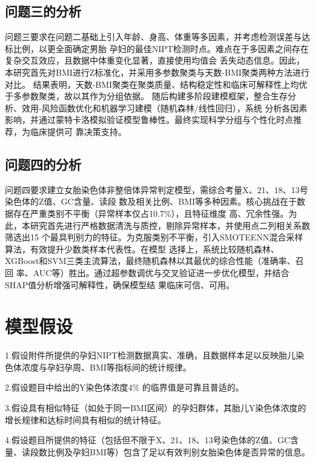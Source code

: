 \documentclass{article}
\begin{document}
\subsection{\textbf{问题三的分析}}
问题三要求在问题二基础上引入年龄、身高、体重等多因素，并考虑检测误差与达标比例，以更全面确定男胎
孕妇的最佳NIPT检测时点。难点在于多因素之间存在复杂交互效应，且数据中体重变化显著，直接使用均值会
丢失动态信息。因此，本研究首先对BMI进行Z标准化，并采用多参数聚类与天数-BMI聚类两种方法进行对比。
结果表明，天数-BMI聚类在聚类质量、结构稳定性和临床可解释性上均优于多参数聚类，故以其作为分组依据。
随后构建多阶段建模框架，整合生存分析、效用-风险函数优化和机器学习建模（随机森林/线性回归），系统
分析各因素影响，并通过蒙特卡洛模拟验证模型鲁棒性。最终实现科学分组与个性化时点推荐，为临床提供可
靠决策支持。
\subsection{\textbf{问题四的分析}}
问题四要求建立女胎染色体非整倍体异常判定模型，需综合考量X、21、18、13号染色体的Z值、GC含量、读段
数及相关比例、BMI等多种因素。核心挑战在于数据存在严重类别不平衡（异常样本仅占10.7\%），且特征维度
高、冗余性强。为此，本研究首先进行严格数据清洗与质控，剔除异常样本，并使用点二列相关系数筛选出15
个最具判别力的特征。为克服类别不平衡，引入SMOTEENN混合采样算法，有效提升少数类样本代表性。在模型
选择上，系统比较随机森林、XGBoost和SVM三类主流算法，最终随机森林以其最优的综合性能（准确率、召回
率、AUC等）胜出。通过超参数调优与交叉验证进一步优化模型，并结合SHAP值分析增强可解释性，确保模型结
果临床可信、可用。
\section{\textbf{模型假设}}
1.假设附件所提供的孕妇NIPT检测数据真实、准确，且数据样本足以反映胎儿染色体浓度与孕妇孕周、BMI等指标间的统计规律。

2.假设题目中给出的Y染色体浓度4\% 的临界值是可靠且普适的。

3.假设具有相似特征（如处于同一BMI区间）的孕妇群体，其胎儿Y染色体浓度的增长规律和达标时间具有相似的统计特征。

4.假设题目所提供的特征（包括但不限于X、21、18、13号染色体的Z值、GC含量、读段数比例及孕妇BMI等）包含了足以有效判别女胎染色体是否异常的信息。
\end{document}
